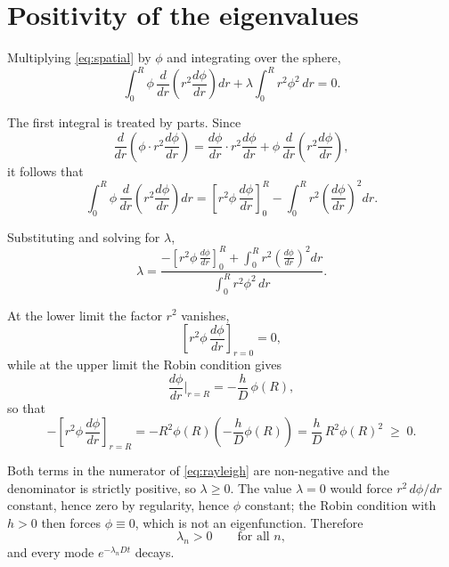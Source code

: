 \documentclass[11pt,a4paper]{article}
\begin{document}
\section{Positivity of the eigenvalues}

Multiplying \eqref{eq:spatial} by $\phi$ and integrating over the sphere,
\begin{equation}
\int_{0}^{R} \phi\,\frac{d}{dr}\!\left(r^{2}\frac{d\phi}{dr}\right) dr
+ \lambda \int_{0}^{R} r^{2}\phi^{2}\,dr = 0 .
\end{equation}

The first integral is treated by parts. Since
\begin{equation}
\frac{d}{dr}\!\left(\phi \cdot r^{2}\frac{d\phi}{dr}\right)
= \frac{d\phi}{dr}\cdot r^{2}\frac{d\phi}{dr}
+ \phi\,\frac{d}{dr}\!\left(r^{2}\frac{d\phi}{dr}\right) ,
\end{equation}
it follows that
\begin{equation}
\int_{0}^{R} \phi\,\frac{d}{dr}\!\left(r^{2}\frac{d\phi}{dr}\right) dr
= \left[r^{2}\phi\,\frac{d\phi}{dr}\right]_{0}^{R}
- \int_{0}^{R} r^{2}\left(\frac{d\phi}{dr}\right)^{2} dr .
\end{equation}

Substituting and solving for $\lambda$,
\begin{equation}
\lambda =
\frac{\displaystyle -\left[r^{2}\phi\,\frac{d\phi}{dr}\right]_{0}^{R}
+ \int_{0}^{R} r^{2}\left(\frac{d\phi}{dr}\right)^{2} dr}
{\displaystyle \int_{0}^{R} r^{2}\phi^{2}\,dr} .
\label{eq:rayleigh}
\end{equation}

At the lower limit the factor $r^{2}$ vanishes,
\begin{equation}
\left[r^{2}\phi\,\frac{d\phi}{dr}\right]_{r=0} = 0 ,
\end{equation}
while at the upper limit the Robin condition gives
\begin{equation}
\frac{d\phi}{dr}\bigg|_{r=R} = -\frac{h}{D}\,\phi(R) ,
\end{equation}
so that
\begin{equation}
-\left[r^{2}\phi\,\frac{d\phi}{dr}\right]_{r=R}
= -R^{2}\phi(R)\left(-\frac{h}{D}\phi(R)\right)
= \frac{h}{D}\,R^{2}\phi(R)^{2} \;\ge\; 0 .
\end{equation}

Both terms in the numerator of \eqref{eq:rayleigh} are non-negative and the
denominator is strictly positive, so $\lambda \ge 0$. The value $\lambda = 0$ would
force $r^{2}\,d\phi/dr$ constant, hence zero by regularity, hence $\phi$ constant;
the Robin condition with $h > 0$ then forces $\phi \equiv 0$, which is not an
eigenfunction. Therefore
\begin{equation}
\lambda_{n} > 0 \qquad \text{for all } n ,
\end{equation}
and every mode $e^{-\lambda_{n} D t}$ decays.
\end{document}
